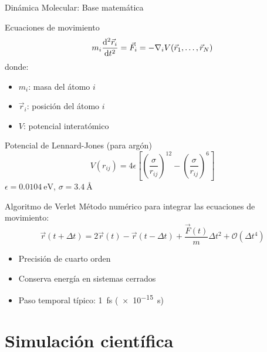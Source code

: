 \documentclass{beamer}
\begin{document}
\begin{frame}{Dinámica Molecular: Base matemática}
  \begin{block}{Ecuaciones de movimiento}
    \[
    m_i \dv[2]{\vec{r}_i}{t} = \vec{F}_i = -\nabla_i V(\vec{r}_1, \dots, \vec{r}_N)
    \]
    donde:
    \begin{itemize}
      \item $m_i$: masa del átomo $i$
      \item $\vec{r}_i$: posición del átomo $i$
      \item $V$: potencial interatómico
    \end{itemize}
  \end{block}
  
  \begin{block}{Potencial de Lennard-Jones (para argón)}
    \[
    V(r_{ij}) = 4\epsilon \left[ \left(\frac{\sigma}{r_{ij}}\right)^{12} - \left(\frac{\sigma}{r_{ij}}\right)^6 \right]
    \]
    $\epsilon=\SI{0.0104}{\electronvolt}$, $\sigma=\SI{3.4}{\angstrom}$
  \end{block}
\end{frame}

\begin{frame}{Algoritmo de Verlet}
  Método numérico para integrar las ecuaciones de movimiento:
  \[
  \vec{r}(t + \Delta t) = 2\vec{r}(t) - \vec{r}(t - \Delta t) + \frac{\vec{F}(t)}{m} \Delta t^2 + \mathcal{O}(\Delta t^4)
  \]
  \begin{itemize}
    \item Precisión de cuarto orden
    \item Conserva energía en sistemas cerrados
    \item Paso temporal típico: \SI{1}{\femto\second} (\SI{e-15}{\second})
  \end{itemize}
\end{frame}

\section{Simulación científica}
\end{document}
